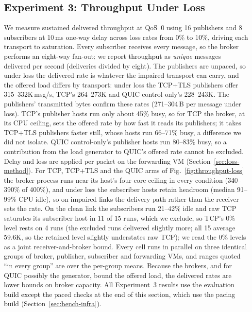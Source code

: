 \documentclass[a4paper,fleqn]{cas-dc}
\begin{document}
\subsection{Experiment 3: Throughput Under Loss}
\label{sec:exp3}

We measure sustained delivered throughput at QoS~0 using 16 publishers and 8 subscribers at 10\,ms one-way delay across loss rates from 0\% to 10\%, driving each transport to saturation. Every subscriber receives every message, so the broker performs an eight-way fan-out; we report throughput as \emph{unique} messages delivered per second (deliveries divided by eight). The publishers are unpaced, so under loss the delivered rate is whatever the impaired transport can carry, and the offered load differs by transport: under loss the TCP+TLS publishers offer 315--332K\,msg/s, TCP's 264--273K and QUIC control-only's 228--243K. The publishers' transmitted bytes confirm these rates (271--304\,B per message under loss). TCP's publisher hosts run only about 45\% busy, so for TCP the broker, at its CPU ceiling, sets the offered rate by how fast it reads its publishers; it takes TCP+TLS publishers faster still, whose hosts run 66--71\% busy, a difference we did not isolate. QUIC control-only's publisher hosts run 80--83\% busy, so a contribution from the load generator to QUIC's offered rate cannot be excluded. Delay and loss are applied per packet on the forwarding VM (Section~\ref{sec:loss-method}). For TCP, TCP+TLS and the QUIC arms of Fig.~\ref{fig:throughput-loss} the broker process runs near its host's four-core ceiling in every condition (340--390\% of 400\%), and under loss the subscriber hosts retain headroom (median 91--99\% CPU idle), so on impaired links the delivery path rather than the receiver sets the rate. On the clean link the subscribers run 21--42\% idle and raw TCP saturates its subscriber host in 11 of 15 runs, which we exclude, so TCP's 0\% level rests on 4 runs (the excluded runs delivered slightly more; all 15 average 59.6K, so the retained level slightly understates raw TCP); we read the 0\% levels as a joint receiver-and-broker bound. Every cell runs in parallel on three identical groups of broker, publisher, subscriber and forwarding VMs, and ranges quoted ``in every group'' are over the per-group means. Because the brokers, and for QUIC possibly the generator, bound the offered load, the delivered rates are lower bounds on broker capacity. All Experiment~3 results use the evaluation build except the paced checks at the end of this section, which use the pacing build (Section~\ref{sec:bench-infra}).
\end{document}
